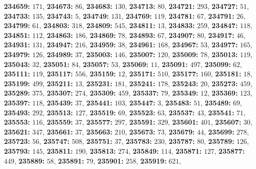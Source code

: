 \textsf{\bfseries 234659:} $171$, \textsf{\bfseries 234673:} $86$, \textsf{\bfseries 234683:} $130$, \textsf{\bfseries 234713:} $80$, \textsf{\bfseries 234721:} $293$, \textsf{\bfseries 234727:} $51$, \textsf{\bfseries 234733:} $135$, \textsf{\bfseries 234743:} $5$, \textsf{\bfseries 234749:} $131$, \textsf{\bfseries 234769:} $119$, \textsf{\bfseries 234781:} $67$, \textsf{\bfseries 234791:} $26$, \textsf{\bfseries 234799:} $61$, \textsf{\bfseries 234803:} $318$, \textsf{\bfseries 234809:} $545$, \textsf{\bfseries 234811:} $13$, \textsf{\bfseries 234833:} $259$, \textsf{\bfseries 234847:} $118$, \textsf{\bfseries 234851:} $112$, \textsf{\bfseries 234863:} $186$, \textsf{\bfseries 234869:} $78$, \textsf{\bfseries 234893:} $67$, \textsf{\bfseries 234907:} $80$, \textsf{\bfseries 234917:} $46$, \textsf{\bfseries 234931:} $131$, \textsf{\bfseries 234947:} $216$, \textsf{\bfseries 234959:} $38$, \textsf{\bfseries 234961:} $168$, \textsf{\bfseries 234967:} $53$, \textsf{\bfseries 234977:} $165$, \textsf{\bfseries 234979:} $126$, \textsf{\bfseries 234989:} $37$, \textsf{\bfseries 235003:} $146$, \textsf{\bfseries 235007:} $120$, \textsf{\bfseries 235009:} $78$, \textsf{\bfseries 235013:} $119$, \textsf{\bfseries 235043:} $32$, \textsf{\bfseries 235051:} $84$, \textsf{\bfseries 235057:} $53$, \textsf{\bfseries 235069:} $11$, \textsf{\bfseries 235091:} $497$, \textsf{\bfseries 235099:} $62$, \textsf{\bfseries 235111:} $119$, \textsf{\bfseries 235117:} $556$, \textsf{\bfseries 235159:} $12$, \textsf{\bfseries 235171:} $510$, \textsf{\bfseries 235177:} $160$, \textsf{\bfseries 235181:} $18$, \textsf{\bfseries 235199:} $499$, \textsf{\bfseries 235211:} $13$, \textsf{\bfseries 235231:} $181$, \textsf{\bfseries 235241:} $178$, \textsf{\bfseries 235243:} $20$, \textsf{\bfseries 235273:} $459$, \textsf{\bfseries 235289:} $375$, \textsf{\bfseries 235307:} $274$, \textsf{\bfseries 235309:} $459$, \textsf{\bfseries 235337:} $79$, \textsf{\bfseries 235349:} $12$, \textsf{\bfseries 235369:} $123$, \textsf{\bfseries 235397:} $118$, \textsf{\bfseries 235439:} $37$, \textsf{\bfseries 235441:} $103$, \textsf{\bfseries 235447:} $3$, \textsf{\bfseries 235483:} $51$, \textsf{\bfseries 235489:} $69$, \textsf{\bfseries 235493:} $292$, \textsf{\bfseries 235513:} $127$, \textsf{\bfseries 235519:} $69$, \textsf{\bfseries 235523:} $63$, \textsf{\bfseries 235537:} $43$, \textsf{\bfseries 235541:} $71$, \textsf{\bfseries 235553:} $116$, \textsf{\bfseries 235559:} $37$, \textsf{\bfseries 235577:} $297$, \textsf{\bfseries 235591:} $329$, \textsf{\bfseries 235601:} $401$, \textsf{\bfseries 235607:} $30$, \textsf{\bfseries 235621:} $347$, \textsf{\bfseries 235661:} $37$, \textsf{\bfseries 235663:} $210$, \textsf{\bfseries 235673:} $73$, \textsf{\bfseries 235679:} $44$, \textsf{\bfseries 235699:} $278$, \textsf{\bfseries 235723:} $56$, \textsf{\bfseries 235747:} $508$, \textsf{\bfseries 235751:} $37$, \textsf{\bfseries 235783:} $230$, \textsf{\bfseries 235787:} $80$, \textsf{\bfseries 235789:} $126$, \textsf{\bfseries 235793:} $145$, \textsf{\bfseries 235811:} $190$, \textsf{\bfseries 235813:} $274$, \textsf{\bfseries 235849:} $114$, \textsf{\bfseries 235871:} $127$, \textsf{\bfseries 235877:} $449$, \textsf{\bfseries 235889:} $58$, \textsf{\bfseries 235891:} $79$, \textsf{\bfseries 235901:} $258$, \textsf{\bfseries 235919:} $621$, 
